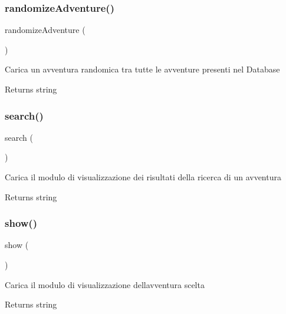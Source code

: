 \subsubsection{\texorpdfstring{randomize\+Adventure()}{randomizeAdventure()}}
{\footnotesize\ttfamily randomize\+Adventure (\begin{DoxyParamCaption}{ }\end{DoxyParamCaption})}

Carica un avventura randomica tra tutte le avventure presenti nel Database

\begin{DoxyReturn}{Returns}
string 
\end{DoxyReturn}
\mbox{\label{class_c_ricerca_a796bf438724e047aeef18579732a3780}} 
\subsubsection{\texorpdfstring{search()}{search()}}
{\footnotesize\ttfamily search (\begin{DoxyParamCaption}{ }\end{DoxyParamCaption})}

Carica il modulo di visualizzazione dei risultati della ricerca di un avventura

\begin{DoxyReturn}{Returns}
string 
\end{DoxyReturn}
\mbox{\label{class_c_ricerca_a2b8e3779f5bd8c38f70307574859bd36}} 
\subsubsection{\texorpdfstring{show()}{show()}}
{\footnotesize\ttfamily show (\begin{DoxyParamCaption}{ }\end{DoxyParamCaption})}

Carica il modulo di visualizzazione dell\textquotesingle{}avventura scelta

\begin{DoxyReturn}{Returns}
string 
\end{DoxyReturn}
\mbox{\label{class_c_ricerca_aa9482546e95fc12ed93c1f37b2173007}} 
